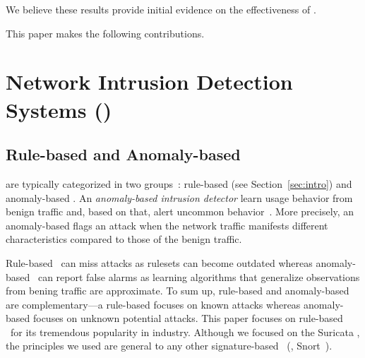 \documentclass[sigconf,review, anonymous]{acmart}
\begin{document}





 We believe these results provide initial
evidence on the effectiveness of \tname{}.

This paper makes the following contributions.

\section{Network Intrusion Detection Systems (\nids)}
\label{sec:background}

\subsection{Rule-based and Anomaly-based \nids}

\sloppy \nids{} are typically categorized in two
groups~\cite{kumar2007survey}: rule-based (see
Section~\ref{sec:intro}) and anomaly-based \nids. An
\emph{anomaly-based intrusion detector} learn usage behavior from
benign traffic and, based on that, alert uncommon
behavior~\cite{7579764,kumar2007survey,Mitchell:2014:SID:2597757.2542049,cordy-etal-issta19}. More
precisely, an anomaly-based \nids{} flags an attack when the network
traffic manifests different characteristics compared to those of the
benign traffic.

Rule-based \nids\ can miss attacks as rulesets can become outdated
whereas anomaly-based \nids\ can report false alarms as learning
algorithms that generalize observations from bening traffic are
approximate. To sum up, rule-based \nids{} and anomaly-based \nids{}
are complementary---a rule-based \nids{} focuses on known attacks
whereas anomaly-based \nids{} focuses on unknown potential attacks.
This paper focuses on rule-based \nids\ for its tremendous popularity
in industry. Although we focused on the Suricata \nids, the principles
we used are general to any other signature-based \nids~(\eg{},
Snort~\cite{snort}).
\end{document}
